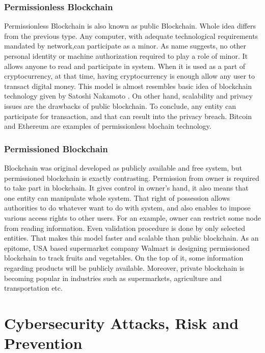 \documentclass[a4paper,twoside,12pt]{report}
\begin{document}
\begin{spacing}{1.5}
\subsection{Permissionless Blockchain}
Permissionless Blockchain is also known as public Blockchain. Whole idea differs from the previous type. Any computer, with adequate technological requirements mandated by network,can participate as a minor. As name suggests, no other personal identity or machine authorization required to play a role of minor. It allows anyone to read and participate in system. When it is used as a part of cryptocurrency, at that time, having cryptocurrency is enough allow any user to transact digital money. This model is almost resembles basic idea of blockchain technology given by Satoshi Nakamoto \cite{satoshinakamoto}. On other hand, scalability and privacy issues are the drawbacks of public blockchain. To conclude, any entity can participate for transaction, and that can result into the privacy breach. Bitcoin and Ethereum are examples of permissionless blochain technology. 
\subsection{Permissioned Blockchain}
Blockchain was original developed as publicly available and free system, but permissioned blockchain is exactly contrasting. Permission from owner is required to take part in blockchain. It gives control in owner's hand, it also means that one entity can manipulate whole system. That right of possession allows authorities to do whatever want to do with system, and also enables to impose various access rights to other users. For an example, owner can restrict some node from reading information. Even validation procedure is done by only selected entities. That makes this model faster and scalable than public blockchain. As an epitome, USA based supermarket company Walmart is designing permissioned blockchain to track fruits and vegetables. On the top of it, some information regarding products will be publicly available. Moreover, private blockchain is becoming popular in industries such as supermarkets, agriculture and transportation etc.
\chapter{Cybersecurity Attacks, Risk and Prevention}
\label{chapter3}

\end{spacing}
\end{document}
